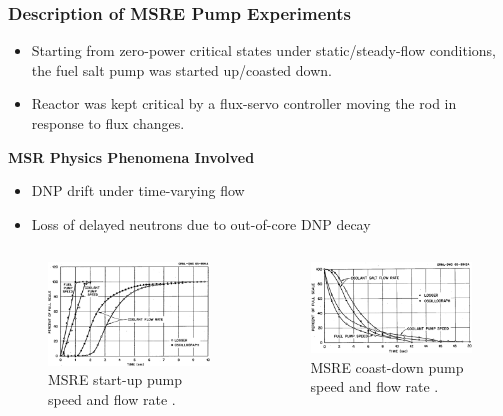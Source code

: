 \begin{frame}
  \frametitle{Description of MSRE Pump Experiments}
  \begin{itemize}
    \item Starting from zero-power critical states under static/steady-flow conditions, the fuel salt pump
  was started up/coasted down.
    \item Reactor was kept critical by a flux-servo controller moving the rod in response to flux
      changes.
  \end{itemize}
  \begin{block}{\textbf{MSR Physics Phenomena Involved}}
    \begin{itemize}
      \item DNP drift under time-varying flow
      \item Loss of delayed neutrons due to out-of-core DNP decay
    \end{itemize}
  \end{block}
  \begin{columns}
    \column{5.5cm}
    \begin{figure}
      \centering
      \includegraphics[width=.8\columnwidth]{images/msre-startup}
      \caption{MSRE start-up pump speed and flow rate
      \cite{prince_zero-power_1968}.}
    \end{figure}
    \column{5.5cm}
    \begin{figure}
      \centering
      \includegraphics[width=.95\columnwidth]{images/msre-coastdown}
      \caption{MSRE coast-down pump speed and flow rate
      \cite{prince_zero-power_1968}.}
    \end{figure}
  \end{columns}
\end{frame}

